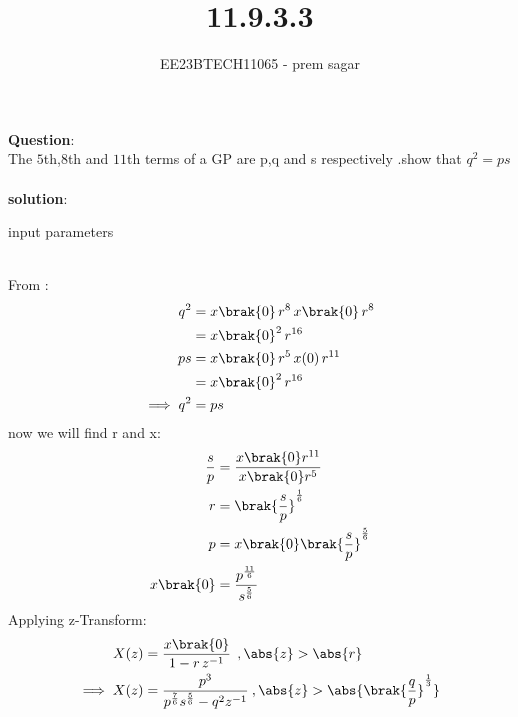 \documentclass[journal,12pt,twocolumn]{IEEEtran}
\theoremstyle{remark}
\begin{document}

\vspace{3cm}

\title{11.9.3.3}
\author{EE23BTECH11065 - prem sagar}
\maketitle
\newpage

\bigskip 

\renewcommand{\thefigure}{\theenumi}
\renewcommand{\thetable}{\theenumi}
\textbf{Question}:\\ The $5$th,$8$th and $11$th terms of a GP are p,q and s respectively .show that $q^2=ps$
\\\\\textbf{solution}:
\fi
\begin{table}[!ht]
   \centering
      
    \caption{input parameters}
    \label{tab:11.9.3.3}
 \end{table}
\\ From :
\begin{align}
q^2&=x\brak{0}\,r^8\,x\brak{0}\,r^8
     \\ &=x\brak{0}^2\,r^{16}
\\ps&=x\brak{0}\,r^5\,x(0)\,r^{11}
       \\&=x\brak{0}^2\,r^{16}
\\\implies q^2&=ps
\end{align}
now we will find r and x:
\begin{align}
\frac{s}{p}&=\frac{x\brak{0}r^{11}}{x\brak{0}r^5}
\\r&=\brak{\frac{s}{p}}^\frac{1}{6} 
\\p&=x\brak{0}\brak{\frac{s}{p}}^\frac{5}{6}
\\x\brak{0}&=\frac{p^\frac{11}{6}}{s^\frac{5}{6}}
\end{align}
Applying z-Transform:
\begin{align}
     X(z) &= \frac{x\brak{0}}{1-r\,z^{-1}}\: \:,\abs{z}>\abs{r}
\\ \implies  X(z)&=\frac{p^3}{p^\frac{7}{6}s^\frac{5}{6}-q^2z^{-1}}\:,\abs{z}>\abs{\brak{\frac{q}{p}}^\frac{1}{3}}
     \end{align}    
\end{document}
